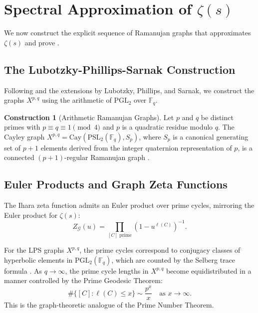 \documentclass[12pt, a4paper]{article}
\theoremstyle{plain}
\theoremstyle{definition}
\newtheorem{construction}[theorem]{Construction}
\theoremstyle{remark}
\newcommand{\calG}{\mathcal{G}}
\begin{document}
\section{Spectral Approximation of $\zeta(s)$}\label{sec:approx}

We now construct the explicit sequence of Ramanujan graphs that approximates
$\zeta(s)$ and prove .

\subsection{The Lubotzky-Phillips-Sarnak Construction}

Following \citet{Selberg1956} and the extensions by Lubotzky, Phillips, and
Sarnak, we construct the graphs $X^{p,q}$ using the arithmetic of
$\mathrm{PGL}_2$ over $\mathbb{F}_q$.

\begin{construction}[Arithmetic Ramanujan Graphs]\label{con:LPS}
  Let $p$ and $q$ be distinct primes with $p \equiv q \equiv 1 \pmod 4$
  and $p$ is a quadratic residue modulo $q$. The Cayley graph
  $X^{p,q} = \mathrm{Cay}(\mathrm{PSL}_2(\mathbb{F}_q), S_p)$, where
  $S_p$ is a canonical generating set of $p+1$ elements derived from
  the integer quaternion representation of $p$, is a connected
  $(p+1)$-regular Ramanujan graph \citep{Selberg1956}.
\end{construction}

\subsection{Euler Products and Graph Zeta Functions}

The Ihara zeta function admits an Euler product over prime cycles, mirroring
the Euler product for $\zeta(s)$:
\begin{equation}\label{eq:euler_ihara}
  Z_\calG(u) = \prod_{[C] \text{ prime}} (1 - u^{\ell(C)})^{-1}.
\end{equation}

For the LPS graphs $X^{p,q}$, the prime cycles correspond to conjugacy classes
of hyperbolic elements in $\mathrm{PGL}_2(\mathbb{F}_q)$, which are counted by
the Selberg trace formula \citep{Selberg1956, Hejhal1976}. As $q \to \infty$,
the prime cycle lengths in $X^{p,q}$ become equidistributed in a manner
controlled by the Prime Geodesic Theorem:
\begin{equation}\label{eq:prime_geodesic}
  \#\{[C] : \ell(C) \leq x\} \sim \frac{p^x}{x} \quad \text{as } x \to \infty.
\end{equation}
This is the graph-theoretic analogue of the Prime Number Theorem.
\end{document}
